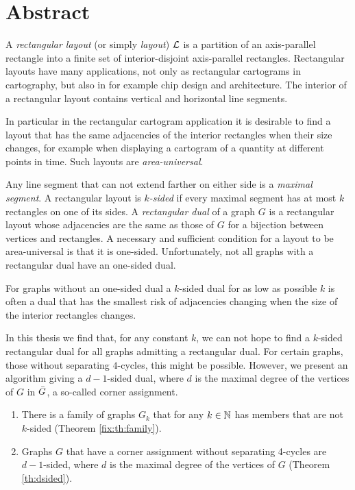
\section*{Abstract}
\thispagestyle{plain}

  A  \emph{rectangular layout} (or simply \emph{layout}) $\mathcal{L}$ is a partition of an axis-parallel rectangle into a finite set of interior-disjoint axis-parallel rectangles. Rectangular layouts have many applications, not only as rectangular cartograms in cartography, but also in for example chip design and architecture. The interior of a rectangular layout contains vertical and horizontal line segments.

  In particular in the rectangular cartogram application it is desirable to find a layout that has the same adjacencies of the interior rectangles when their size changes, for example when displaying a cartogram of a quantity at different points in time. Such layouts are \emph{area-universal}.

  Any line segment that can not extend farther on either side is a \emph{maximal segment}.
  A rectangular layout is \emph{$k$-sided} if every maximal segment has at most $k$ rectangles on one of its sides.
  A \emph{rectangular dual} of a graph $G$ is a rectangular layout whose adjacencies are the same as those of $G$ for a bijection between vertices and rectangles.
  A necessary and sufficient condition for a layout to be area-universal is that it is one-sided.
  Unfortunately, not all graphs with a rectangular dual have an one-sided dual.

  For graphs without an one-sided dual a $k$-sided dual for as low as possible $k$ is often a dual that has the smallest risk of adjacencies changing when the size of the interior rectangles changes.

  In this thesis we find that, for any constant $k$, we can not hope to find a $k$-sided rectangular dual for all graphs admitting a rectangular dual.
  For certain graphs, those without separating $4$-cycles, this might be possible. However, we present an algorithm giving a $d-1$-sided dual, where $d$ is the maximal degree of the vertices of $G$ in $\bar{G}$, a so-called corner assignment.
  \begin{enumerate}
    \item There is a family of graphs $G_k$ that for any $k \in \mathbb{N}$ has members that are not $k$-sided (Theorem \ref{fix:th:family}).
    \item Graphs $G$ that have a corner assignment without separating 4-cycles are $d-1$-sided, where $d$ is the maximal degree of the vertices of $G$ (Theorem \ref{th:dsided}).
  \end{enumerate}

